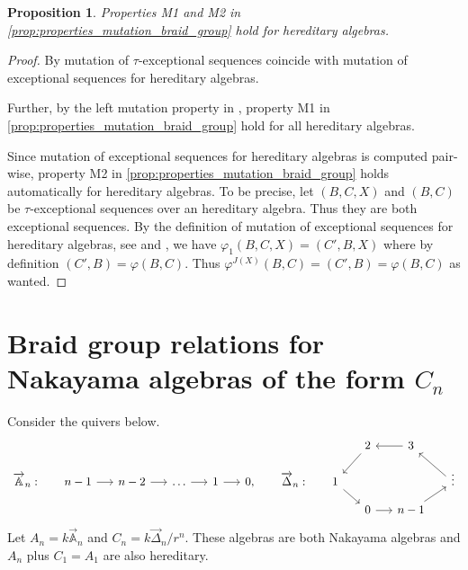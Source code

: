 \documentclass[11pt]{amsart}
\newcommand{\A}{\mathbb{A}}
\newtheorem{proposition}[theorem]{Proposition}
\theoremstyle{definition}
\begin{document}
\begin{proposition}\label{prop:hereditary_properties_mutation_braid_group}
    Properties M1 and M2 in \cref{prop:properties_mutation_braid_group} hold for hereditary algebras.
\end{proposition}

\begin{proof}
    By \cite[Thm. 6.1]{BHM2024} mutation of $\tau$-exceptional sequences coincide with mutation of exceptional sequences for hereditary algebras. 

    Further, by the left mutation property in \cite[Lem. 6]{cbw92}, property M1 in \cref{prop:properties_mutation_braid_group} hold for all hereditary algebras.

    Since mutation of exceptional sequences for hereditary algebras is computed pair-wise, property M2 in \cref{prop:properties_mutation_braid_group} holds automatically for hereditary algebras. To be precise, let $(B,C,X)$ and $(B,C)$ be $\tau$-exceptional sequences over an hereditary algebra. Thus they are both exceptional sequences. By the definition of mutation of exceptional sequences for hereditary algebras, see \cite[Lem. 6]{cbw92} and \cite[Sec. 1.1]{BRT2011}, we have $\varphi_1(B,C,X) = (C',B,X)$ where by definition $(C',B) = \varphi(B,C)$. Thus $\varphi^{J(X)}(B,C) = (C',B) = \varphi(B,C)$ as wanted.
\end{proof}

\section{Braid group relations for Nakayama algebras of the form $C_n$}\label{sec:cycliccase}

Consider the quivers below.
\begin{equation*} \label{eq:Nakayamaquiver}
\begin{tikzcd}[column sep=5mm, row sep=3mm]
    &&&&&&&& 2 \arrow[ld] & 3 \arrow[l] \\
    \overrightarrow{\A}_n: &n-1 \arrow[r] & n-2 \arrow[r] &\dots \arrow[r] & 1 \arrow[r] &0, & \overrightarrow{\Delta}_n: &1 \arrow[rd] & && \vdots \arrow[lu]\\
    &&&&&&&& 0 \arrow[r] & n-1 \arrow[ru]
\end{tikzcd}\end{equation*} Let $A_n = k\overrightarrow{\A}_n$ and $C_n = k\overrightarrow{\Delta}_n/r^n$. These algebras are both Nakayama algebras and $A_n$ plus $C_1 = A_1$ are also hereditary. 
\end{document}
